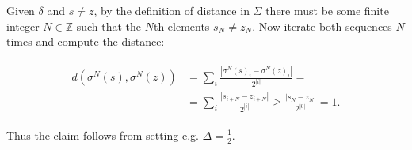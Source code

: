 \begin{solution}[7.4]
Given $\delta$ and $s \ne z$, by the definition of distance in $\Sigma$ there must be some finite integer $N \in \mathbb{Z}$ such that the $N$th elements $s_{N} \ne z_{N}$. Now iterate both sequences $N$ times and compute the distance: 

\begin{align}
\begin{aligned}
    d(\sigma^N(s), \sigma^N(z)) &= \sum_i \frac{|\sigma^N(s)_i - \sigma^N(z)_i|}{2^{|i|}} =\\&= \sum_i \frac{|s_{i+N} - z_{i+N}|}{2^{|i|}} \geq \frac{|s_{N} - z_{N}|}{2^{|0|}} = 1.
\end{aligned}
\end{align}

Thus the claim follows from setting e.g. $\Delta = \frac{1}{2}$.

\end{solution}

